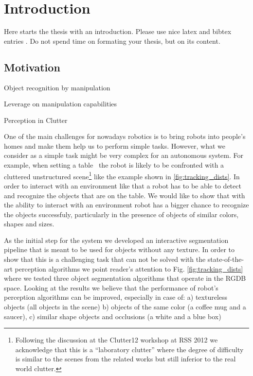 \chapter{Introduction}
\label{chapter:Introduction}



Here starts the thesis with an introduction. Please use nice latex and bibtex entries \cite{latex}. Do not spend time on formating your thesis, but on its content. 
 
\section{Motivation}
\itemize 
\item Object recognition by manipulation
\item Leverage on manipulation capabilities
\item Perception in Clutter

\label{sec:intro}
One of the main challenges for nowadays robotics is to bring robots into people's homes and make them help us to perform simple tasks. However, what we consider as a simple task might be very complex for an autonomous system. For example, when setting a table~\cite{iros10kcopman} the robot is likely to be
confronted with a cluttered unstructured scene\footnote{Following the discussion at the Clutter12
workshop at RSS 2012 we acknowledge that this is a ``laboratory clutter'' where the degree of difficulty
is similar to the scenes from the related works but still inferior to the real world clutter.} like the example shown
in \ref{fig:tracking_dists}. In order to interact with an environment like that a robot has to be able to detect and recognize the objects that are on the table. We would like to show that with the ability to interact with an environment robot has a bigger chance to recognize the objects successfuly, particularly in the presence of objects of similar colors, shapes and sizes. 


As the initial step for the system we developed an interactive segmentation pipeline that is meant to be used for objects without any texture. In order to show that this is a challenging task that can not be solved with the state-of-the-art perception algorithms we point reader's attention to Fig. \ref{fig:tracking_dists} where we tested three object segmentation algorithms that operate in the RGDB space. Looking at the results we believe that the performance of robot's perception algorithms can be improved, especially in case of: 
a) textureless objects (all objects in the scene)
b) objects of the same color (a coffee mug and a saucer), 
c) similar shape objects and occlusions (a white and a blue box) 



